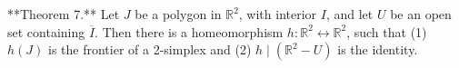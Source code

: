 **Theorem 7.** Let $J$ be a polygon in $\mathbb{R}^2$, with interior $I$, and let $U$ be an open set containing $\overline{I}$. Then there is a homeomorphism $h: \mathbb{R}^2 \leftrightarrow \mathbb{R}^2$, such that (1) $h(J)$ is the frontier of a 2-simplex and (2) $h \mid (\mathbb{R}^2 - U)$ is the identity.
